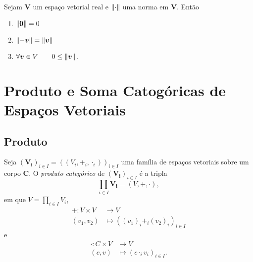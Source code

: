 \begin{prop}
	Sejam $\bm V$ um espaço vetorial real e $\left\Vert{\cdot}\right\Vert$ uma norma em $\bm V$. Então
	\begin{enumerate}
	\item $\left\Vert{\bm 0}\right\Vert = 0$
	\item $\left\Vert{- \bm v}\right\Vert = \left\Vert{\bm v}\right\Vert$
	\item $\forall \bm v \in V \qquad 0 \leq \left\Vert{\bm v}\right\Vert$.
	\end{enumerate}
\end{prop}






























\cleardoublepage
\section{Produto e Soma Catogóricas de Espaços Vetoriais}

\subsection{Produto}

\begin{defi}
Seja $(\bm{V_i})_{i \in I} = ((V_i,+_i,\cdot_i))_{i \in I}$ uma família de espaços vetoriais sobre um corpo $\bm C$. O \emph{produto categórico} de $(\bm{V_i})_{i \in I}$ é a tripla
	\begin{equation*}
	\prod_{i \in I} \bm{V_i} = (V,+,\cdot),
	\end{equation*}
em que $V = \prod_{i \in I} V_i$,
	\begin{align*}
	+: V \times V &\to V \\
			(v_1,v_2) &\mapsto ((v_1)_i +_i (v_2)_i)_{i \in I}
	\end{align*}
e
	\begin{align*}
	\cdot: C \times V &\to V \\
			(c,v) &\mapsto (c \cdot_i v_i)_{i \in I}.
	\end{align*}
\end{defi}

